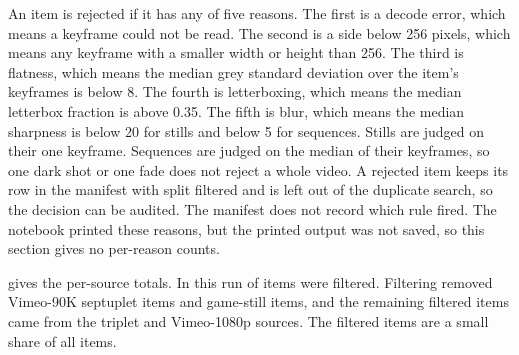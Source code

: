 An item is rejected if it has any of five reasons. The first is a decode error, which means a keyframe could not be read. The second is a side below 256 pixels, which means any keyframe with a smaller width or height than 256. The third is flatness, which means the median grey standard deviation over the item's keyframes is below 8. The fourth is letterboxing, which means the median letterbox fraction is above 0.35. The fifth is blur, which means the median sharpness is below 20 for stills and below 5 for sequences. Stills are judged on their one keyframe. Sequences are judged on the median of their keyframes, so one dark shot or one fade does not reject a whole video. A rejected item keeps its row in the manifest with split filtered and is left out of the duplicate search, so the decision can be audited. The manifest does not record which rule fired. The notebook printed these reasons, but the printed output was not saved, so this section gives no per-reason counts.

 gives the per-source totals. In this run  of  items were filtered. Filtering removed  Vimeo-90K septuplet items and  game-still items, and the remaining filtered items came from the triplet and Vimeo-1080p sources. The filtered items are a small share of all items. \Preliminary

